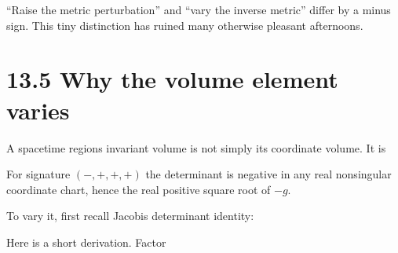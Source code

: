 \documentclass[
  11pt,
  letterpaper,
  oneside,
  openany]{scrbook}
\begin{document}
\begin{center}
\begingroup
{}
\ifdim\wd\grmathbox>\linewidth
\resizebox{\linewidth}{!}{\usebox{\grmathbox}}
\else\usebox{\grmathbox}\fi
\endgroup
\end{center}

``Raise the metric perturbation'' and ``vary the inverse metric'' differ
by a minus sign. This tiny distinction has ruined many otherwise
pleasant afternoons.

\hypertarget{why-the-volume-element-varies}{%
\section{13.5 Why the volume element
varies}\label{why-the-volume-element-varies}}

A spacetime region\textquotesingle s invariant volume is not simply its
coordinate volume. It is

\begin{center}
\begingroup
{}
\ifdim\wd\grmathbox>\linewidth
\resizebox{\linewidth}{!}{\usebox{\grmathbox}}
\else\usebox{\grmathbox}\fi
\endgroup
\end{center}

For signature \((-,+,+,+)\) the determinant is negative in any real
nonsingular coordinate chart, hence the real positive square root of
\(-g\).

To vary it, first recall Jacobi\textquotesingle s determinant identity:

\begin{center}
\begingroup
{}
\ifdim\wd\grmathbox>\linewidth
\resizebox{\linewidth}{!}{\usebox{\grmathbox}}
\else\usebox{\grmathbox}\fi
\endgroup
\end{center}

Here is a short derivation. Factor

\begin{center}
\begingroup
{}
\ifdim\wd\grmathbox>\linewidth
\resizebox{\linewidth}{!}{\usebox{\grmathbox}}
\else\usebox{\grmathbox}\fi
\endgroup
\end{center}
\end{document}
